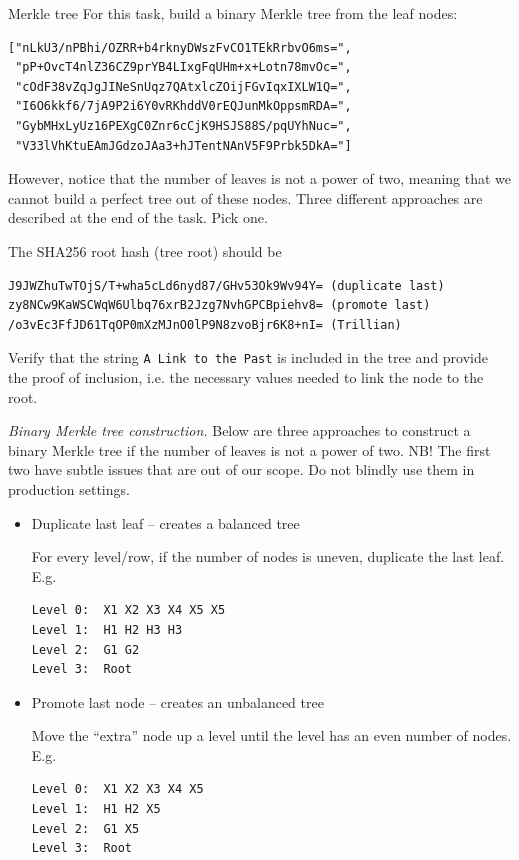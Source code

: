 \documentclass{practice}
\begin{document}
\begin{task}{Merkle tree}
  For this task, build a binary Merkle tree from the leaf nodes:
  \begin{Verbatim}
["nLkU3/nPBhi/OZRR+b4rknyDWszFvCO1TEkRrbvO6ms=",
 "pP+OvcT4nlZ36CZ9prYB4LIxgFqUHm+x+Lotn78mvOc=",
 "cOdF38vZqJgJINeSnUqz7QAtxlcZOijFGvIqxIXLW1Q=",
 "I6O6kkf6/7jA9P2i6Y0vRKhddV0rEQJunMkOppsmRDA=",
 "GybMHxLyUz16PEXgC0Znr6cCjK9HSJS88S/pqUYhNuc=",
 "V33lVhKtuEAmJGdzoJAa3+hJTentNAnV5F9Prbk5DkA="]
  \end{Verbatim}

  However, notice that the number of leaves is not a power of two, meaning that we cannot build a perfect tree out of these nodes.
  Three different approaches are described at the end of the task.
  Pick one.

  The SHA256 root hash (tree root) should be
  \begin{Verbatim}
J9JWZhuTwTOjS/T+wha5cLd6nyd87/GHv53Ok9Wv94Y= (duplicate last)
zy8NCw9KaWSCWqW6Ulbq76xrB2Jzg7NvhGPCBpiehv8= (promote last)
/o3vEc3FfJD61TqOP0mXzMJnO0lP9N8zvoBjr6K8+nI= (Trillian)
  \end{Verbatim}

  Verify that the string \texttt{A Link to the Past} is included in the tree and provide the proof of inclusion, i.e. the necessary values needed to link the node to the root.

  \textit{Binary Merkle tree construction.}
  Below are three approaches to construct a binary Merkle tree if the number of leaves is not a power of two.
  NB! The first two have subtle issues that are out of our scope.
  Do not blindly use them in production settings.

  \begin{itemize}
    \item Duplicate last leaf -- creates a balanced tree
    
    For every level/row, if the number of nodes is uneven, duplicate the last leaf. E.g.
    \begin{Verbatim}
Level 0:  X1 X2 X3 X4 X5 X5
Level 1:  H1 H2 H3 H3
Level 2:  G1 G2
Level 3:  Root
    \end{Verbatim}
    \item Promote last node -- creates an unbalanced tree
    
    Move the \enquote{extra} node up a level until the level has an even number of nodes. E.g.
    \begin{Verbatim}
Level 0:  X1 X2 X3 X4 X5
Level 1:  H1 H2 X5
Level 2:  G1 X5
Level 3:  Root
    \end{Verbatim}


\end{itemize}
\end{task}
\end{document}
